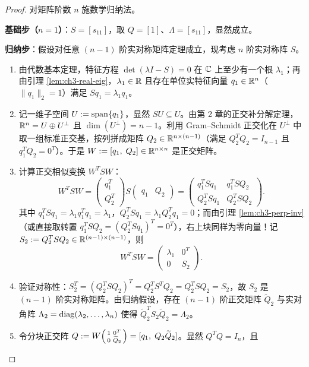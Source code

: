 \begin{proof}
对矩阵阶数 $n$ 施数学归纳法。

\textbf{基础步（$n=1$）}：$S = [s_{11}]$，取 $Q = [1]$、$\Lambda = [s_{11}]$，显然成立。

\textbf{归纳步}：假设对任意 $(n-1)$ 阶实对称矩阵定理成立，现考虑 $n$ 阶实对称阵 $S$。
\begin{enumerate}
  \item 由代数基本定理，特征方程 $\det(\lambda I - S) = 0$ 在 $\mathbb{C}$ 上至少有一个根 $\lambda_1$；再由引理 \ref{lem:ch3-real-eig}，$\lambda_1 \in \mathbb{R}$ 且存在单位实特征向量 $q_1 \in \mathbb{R}^n$（$\|q_1\|_2 = 1$）满足 $Sq_1 = \lambda_1 q_1$。
  \item 记一维子空间 $U := \operatorname{span}\{q_1\}$，显然 $SU \subseteq U$。由第 2 章的正交补分解定理，$\mathbb{R}^n = U \oplus U^\perp$ 且 $\dim(U^\perp) = n-1$。利用 Gram--Schmidt 正交化在 $U^\perp$ 中取一组标准正交基，按列拼成矩阵 $Q_2 \in \mathbb{R}^{n\times(n-1)}$（满足 $Q_2^T Q_2 = I_{n-1}$ 且 $q_1^T Q_2 = 0^T$）。于是 $W := [q_1,\; Q_2] \in \mathbb{R}^{n\times n}$ 是正交矩阵。
  \item 计算正交相似变换 $W^T S W$：
  \[
    W^T S W
    = \begin{pmatrix} q_1^T \\ Q_2^T \end{pmatrix} S \begin{pmatrix} q_1 & Q_2 \end{pmatrix}
    = \begin{pmatrix} q_1^T S q_1 & q_1^T S Q_2 \\ Q_2^T S q_1 & Q_2^T S Q_2 \end{pmatrix}.
  \]
  其中 $q_1^T S q_1 = \lambda_1 q_1^T q_1 = \lambda_1$，$Q_2^T S q_1 = \lambda_1 Q_2^T q_1 = 0$；而由引理 \ref{lem:ch3-perp-inv}（或直接取转置 $q_1^T S Q_2 = (Q_2^T S q_1)^T = 0^T$），右上块同样为零向量！记 $S_2 := Q_2^T S Q_2 \in \mathbb{R}^{(n-1)\times(n-1)}$，则
  \[
    W^T S W = \begin{pmatrix} \lambda_1 & 0^T \\ 0 & S_2 \end{pmatrix}.
  \]
  \item 验证对称性：$S_2^T = (Q_2^T S Q_2)^T = Q_2^T S^T Q_2 = Q_2^T S Q_2 = S_2$，故 $S_2$ 是 $(n-1)$ 阶实对称矩阵。由归纳假设，存在 $(n-1)$ 阶正交矩阵 $\widetilde{Q}_2$ 与实对角阵 $\Lambda_2 = \operatorname{diag}(\lambda_2,\dots,\lambda_n)$ 使得 $\widetilde{Q}_2^T S_2 \widetilde{Q}_2 = \Lambda_2$。
  \item 令分块正交阵 $Q := W \begin{psmallmatrix} 1 & 0^T \\ 0 & \widetilde{Q}_2 \end{psmallmatrix} = [q_1,\; Q_2 \widetilde{Q}_2]$。显然 $Q^T Q = I_n$，且

\end{enumerate}
\end{proof}
